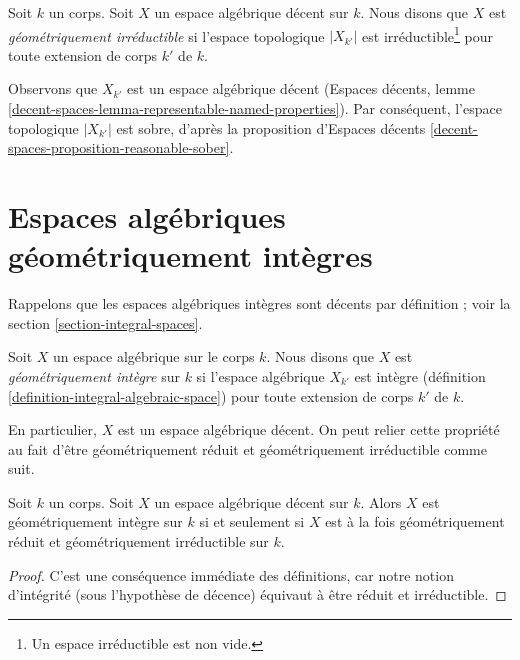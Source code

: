 \begin{definition}
\label{definition-geometrically-irreducible}
Soit $k$ un corps.
Soit $X$ un espace algébrique décent sur $k$.
Nous disons que $X$ est {\it géométriquement irréductible} si l'espace
topologique $|X_{k'}|$ est
irréductible\footnote{Un espace irréductible est non vide.}
pour toute extension de corps $k'$ de $k$.
\end{definition}

\noindent
Observons que $X_{k'}$ est un espace algébrique décent
(Espaces décents, lemme
\ref{decent-spaces-lemma-representable-named-properties}).
Par conséquent, l'espace topologique $|X_{k'}|$ est sobre,
d'après la proposition d'Espaces décents \ref{decent-spaces-proposition-reasonable-sober}.





\section{Espaces algébriques géométriquement intègres}
\label{section-geometrically-integral}

\noindent
Rappelons que les espaces algébriques intègres sont décents par définition ; voir
la section \ref{section-integral-spaces}.

\begin{definition}
\label{definition-geometrically-integral}
Soit $X$ un espace algébrique sur le corps $k$. Nous disons que $X$ est
{\it géométriquement intègre} sur $k$ si l'espace algébrique
$X_{k'}$ est intègre (définition \ref{definition-integral-algebraic-space})
pour toute extension de corps $k'$ de $k$.
\end{definition}

\noindent
En particulier, $X$ est un espace algébrique décent.
On peut relier cette propriété au fait d'être géométriquement réduit et
géométriquement irréductible comme suit.

\begin{lemma}
\label{lemma-geometrically-integral}
Soit $k$ un corps. Soit $X$ un espace algébrique décent sur $k$.
Alors $X$ est géométriquement intègre sur $k$ si et seulement si
$X$ est à la fois géométriquement réduit et géométriquement irréductible
sur $k$.
\end{lemma}

\begin{proof}
C'est une conséquence immédiate des définitions, car notre
notion d'intégrité (sous l'hypothèse de décence) équivaut à
être réduit et irréductible.
\end{proof}

